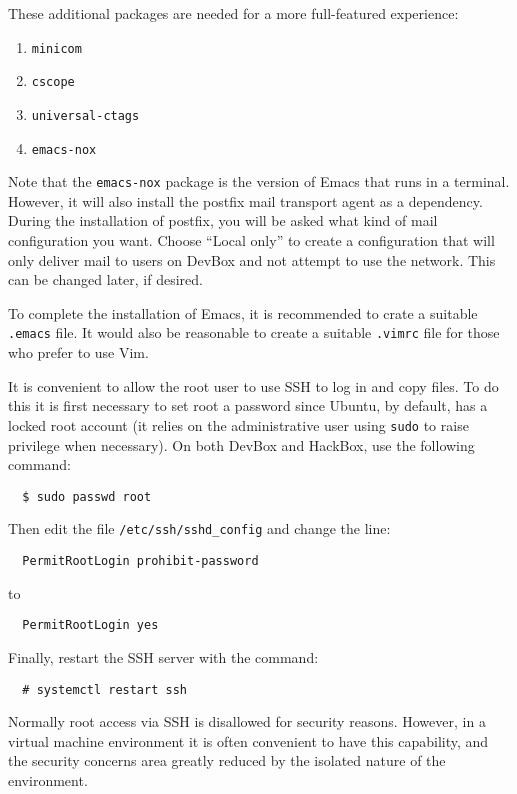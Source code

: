 \documentclass[twocolumn]{article}
\newcommand{\command}[1]{\texttt{#1}}
\newcommand{\filename}[1]{\texttt{#1}}
\begin{document}
These additional packages are needed for a more full-featured experience:
\begin{enumerate}
  \item \texttt{minicom}
  \item \texttt{cscope}
  \item \texttt{universal-ctags}
  \item \texttt{emacs-nox}
\end{enumerate}

Note that the \texttt{emacs-nox} package is the version of Emacs that runs in a terminal.
However, it will also install the postfix mail transport agent as a dependency. During the
installation of postfix, you will be asked what kind of mail configuration you want. Choose
``Local only'' to create a configuration that will only deliver mail to users on DevBox and not
attempt to use the network. This can be changed later, if desired.

To complete the installation of Emacs, it is recommended to crate a suitable \filename{.emacs}
file. It would also be reasonable to create a suitable \filename{.vimrc} file for those who
prefer to use Vim.

It is convenient to allow the root user to use SSH to log in and copy files. To do this it is
first necessary to set root a password since Ubuntu, by default, has a locked root account (it
relies on the administrative user using \command{sudo} to raise privilege when necessary). On
both DevBox and HackBox, use the following command:
\begin{Verbatim}
  $ sudo passwd root
\end{Verbatim}

Then edit the file \texttt{/etc/ssh/sshd\_config} and change the line:
\begin{Verbatim}
  PermitRootLogin prohibit-password
\end{Verbatim}
to
\begin{Verbatim}
  PermitRootLogin yes
\end{Verbatim}

Finally, restart the SSH server with the command:
\begin{Verbatim}
  # systemctl restart ssh
\end{Verbatim}

Normally root access via SSH is disallowed for security reasons. However, in a virtual machine
environment it is often convenient to have this capability, and the security concerns area
greatly reduced by the isolated nature of the environment.
\end{document}
